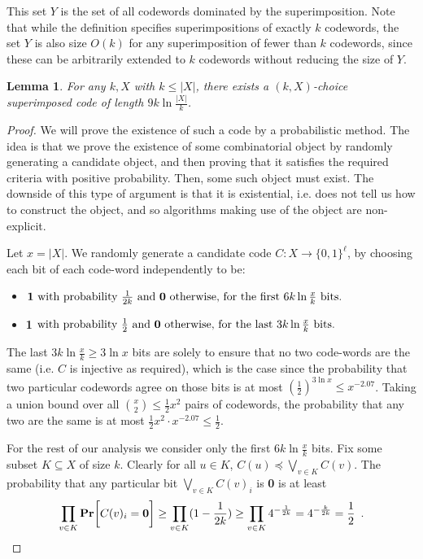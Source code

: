 \documentclass{article}
\newcommand{\Prob}[1]{\mathbf{Pr}\bigg[#1\bigg]}
\newtheorem{lemma}[theorem]{Lemma}
\begin{document}
This set $Y$ is the set of all codewords dominated by the superimposition. Note that while the definition specifies superimpositions of exactly $k$ codewords, the set $Y$ is also size $O(k)$ for any superimposition of fewer than $k$ codewords, since these can be arbitrarily extended to $k$ codewords without reducing the size of $Y$.

\begin{lemma}
	For any $k,X$ with $k\leq |X|$, there exists a $(k,X)$-choice superimposed code of length $9k\ln \frac {|X|}{k}$.
\end{lemma}

\begin{proof}
	We will prove the existence of such a code by a probabilistic method. The idea is that we prove the existence of some combinatorial object by randomly generating a candidate object, and then proving that it satisfies the required criteria with positive probability. Then, some such object must exist. The downside of this type of argument is that it is existential, i.e. does not tell us how to construct the object, and so algorithms making use of the object are non-explicit.
	
	Let $x=|X|$. We randomly generate a candidate code $C:X\rightarrow \{0,1\}^\ell$, by choosing each bit of each code-word independently to be: 
	\begin{itemize}
		\item $\textbf 1 \text{ with probability }\frac{1}{2k}\text{ and \textbf 0 otherwise, for the first }6k\ln \frac xk\text{ bits.}$\\
		\item \textbf 1$\text{ with probability }\frac{1}{2}\text{ and \textbf 0 otherwise, for the last }3k\ln \frac xk\text{ bits. }$
	\end{itemize}
	
	The last $3k\ln \frac xk\geq 3\ln x$ bits are solely to ensure that no two code-words are the same (i.e. $C$ is injective as required), which is the case since the probability that two particular codewords agree on those bits is at most $(\frac 12) ^ {3\ln x} \leq x^{-2.07}$. Taking a union bound over all $\binom x2\le \frac 12 x^2$ pairs of codewords, the probability that any two are the same is at most $\frac 12 x^2 \cdot x^{-2.07} \leq \frac 12$.
	
	For the rest of our analysis we consider only the first $6k\ln \frac xk$ bits. Fix some subset $K\subseteq X$ of size $k$. Clearly for all $u\in K$, $C(u)\preceq\bigvee_{v\in K}C(v)$. The probability that any particular bit $\bigvee_{v\in K}C(v)_i$ is \textbf 0 is at least 
	\[\prod_{v\in K} \Prob{C(v)_i = \textbf 0} \geq \prod_{v\in K} (1-\frac{1}{2k})\geq \prod_{v\in K} 4^{-\frac{1}{2k}} = 4^{-\frac{k}{2k}}= \frac 12\enspace.\]
	

\end{proof}
\end{document}
